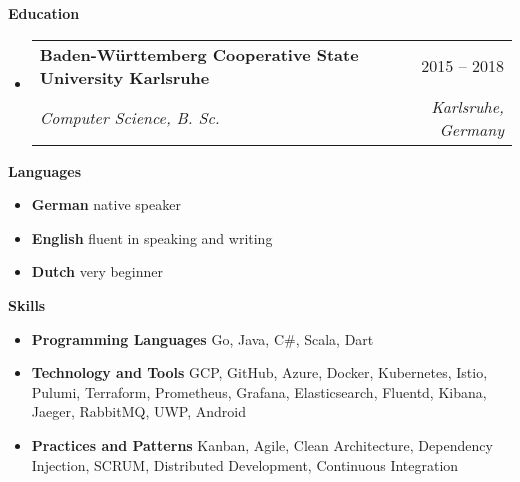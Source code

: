 \documentclass[letterpaper,12pt]{article}
\makeatletter
\def \entryspacing {-0pt}
\renewcommand{\section}[2]{\vspace{5pt}
  \colorbox{teriary}{\color{white}\raggedbottom\normalsize\textbf{{#1}{\hspace{7pt}#2}}}
}
\newcommand{\resumeEntryStart}{\begin{itemize}[leftmargin=2.5mm]}
\newcommand{\resumeEntryEnd}{\end{itemize}\vspace{\entryspacing}}
\newcommand{\resumeEntryTSDL}[4]{
  \vspace{-1pt}\item[]
    \begin{tabularx}{0.97\textwidth}{X@{\hspace{60pt}}r}
      \textbf{\color{primary}#1} & {\color{accent}\small#2} \\
      \textit{\color{accent}\small#3} & \textit{\color{accent}\small#4} \\
    \end{tabularx}\vspace{-6pt}
}
\newcommand{\resumeEntryS}[2]{
  \item[]\small{
    \textbf{\color{primary}#1 }{ #2 \vspace{-6pt}}
  }
}
\makeatother
\begin{document}
\section{\faGraduationCap}{Education}

\resumeEntryStart
  \resumeEntryTSDL
    {Baden-Württemberg Cooperative State University Karlsruhe}{2015 -- 2018}
    {Computer Science, B. Sc.}{Karlsruhe, Germany}
\resumeEntryEnd

\section{\faCommentDots}{Languages}

\resumeEntryStart
  \resumeEntryS{German} {native speaker}
  \resumeEntryS{English} {fluent in speaking and writing}
  \resumeEntryS{Dutch} {very beginner}
\resumeEntryEnd


\section{}{Skills}
\resumeEntryStart
  \resumeEntryS{Programming Languages} {Go, Java, C\#, Scala, Dart}
  \resumeEntryS{Technology and Tools} {GCP, GitHub, Azure, Docker, Kubernetes, Istio, Pulumi, Terraform, Prometheus, Grafana, Elasticsearch, Fluentd, Kibana, Jaeger, RabbitMQ, UWP, Android}
  \resumeEntryS{Practices and Patterns} {Kanban, Agile, Clean Architecture, Dependency Injection, SCRUM, Distributed Development, Continuous Integration}
\resumeEntryEnd
\end{document}
